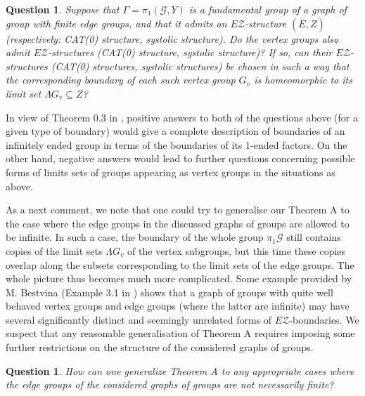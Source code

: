 \documentclass[12pt, a4paper]{article}
\newcommand{\8}{\infty}
\theoremstyle{break}
\newtheorem{oprob}[thm]{Question}
\theoremstyle{defbreak}
\newcommand{\ol}[1]{\overline{#1}}
\begin{document}
\begin{oprob}\label{Open_problem_1}
    Suppose that $\Gamma = \pi_1(\mathcal{G},Y)$ is a fundamental group of a graph of group with finite edge groups, and that it admits an $E\mathcal{Z}$-structure $(\ol{E},Z)$ (respectively: CAT(0) structure, systolic structure). 
Do the vertex groups also admit $E\mathcal{Z}$-structures (CAT(0) structure, systolic structure)? 
If so, can their $E\mathcal{Z}$-structures (CAT(0) structures, systolic structures) be chosen in such a way 
that the corresponding boundary of each such vertex group $G_v$ is homeomorphic to its limit set $\Lambda G_v\subseteq Z$?
\end{oprob}

In view of Theorem 0.3 in \cite{dense-amalgam},
positive answers to both of the questions above (for a given type of boundary) would give a complete description of boundaries
of an infinitely ended group in terms of the boundaries
of its 1-ended factors.
On the other hand, negative answers would lead to further questions concerning possible forms of limits sets of groups appearing as vertex groups in the situations as above. 
 

As a next comment, we note that one could try to generalise our Theorem A to the case where the edge groups in the discussed graphs of groups are allowed to be infinite.
In such a case, the boundary of the whole group $\pi_1\mathcal{G}$
still contains copies of the limit sets $\Lambda G_v$ of the vertex subgroups, but this time these copies overlap along
the subsets corresponding to the limit sets of the edge groups.
The whole picture thus becomes much more complicated.
Some example provided by M. Bestvina (Example 3.1 in \cite{bestvina}) shows that a graph of groups with quite
well behaved vertex groups and edge groups (where the latter are infinite) may have several significantly distinct and seemingly unrelated forms
of $E\mathcal{Z}$-boundaries.
We suspect that any reasonable generalisation of Theorem A
requires imposing some further restrictions on the structure of the considered graphs of groups.\medskip

\begin{oprob}
    How can one generalize Theorem A to any appropriate cases where the edge groups of the considered graphs of groups are not necessarily finite?
\end{oprob}
\end{document}
